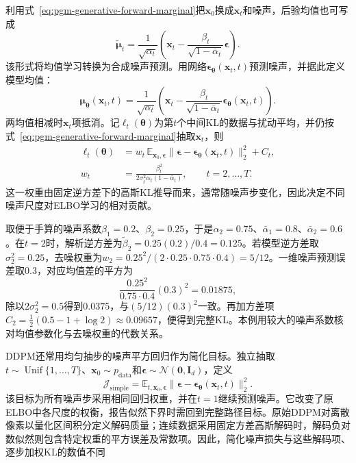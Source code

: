 利用式~\eqref{eq:pgm-generative-forward-marginal}把$\bm{x}_0$换成$\bm{x}_t$和噪声，后验均值也可写成
\[
  \widetilde{\bm{\mu}}_t
  =\frac{1}{\sqrt{\alpha_t}}
       \left(\bm{x}_t-
          \frac{\beta_t}{\sqrt{1-\bar{\alpha}_t}}\bm{\epsilon}\right).
\]
该形式将均值学习转换为合成噪声预测。用网络$\bm{\epsilon}_{\bm{\theta}}(\bm{x}_t,t)$预测噪声，并据此定义模型均值：
\begin{equation}
  \label{eq:pgm-generative-noise-parameterization}
  \bm{\mu}_{\bm{\theta}}(\bm{x}_t,t)
  =\frac{1}{\sqrt{\alpha_t}}
       \left(\bm{x}_t-
          \frac{\beta_t}{\sqrt{1-\bar{\alpha}_t}}
               \bm{\epsilon}_{\bm{\theta}}(\bm{x}_t,t)\right).
\end{equation}
两均值相减时$\bm{x}_t$项抵消。记$\ell_t(\bm{\theta})$为第$t$个中间KL的数据与扰动平均，并仍按式~\eqref{eq:pgm-generative-forward-marginal}抽取$\bm{x}_t$，则
\begin{equation}
  \label{eq:pgm-generative-weighted-denoising}
  \begin{aligned}
    \ell_t(\bm{\theta})
      &=w_t\,\mathbb{E}_{\bm{x}_0,\bm{\epsilon}}
         \lVert\bm{\epsilon}
          -\bm{\epsilon}_{\bm{\theta}}(\bm{x}_t,t)\rVert_2^2+C_t,\\
    w_t&=\frac{\beta_t^2}
              {2\sigma_t^2\alpha_t(1-\bar{\alpha}_t)},
          \qquad t=2,\ldots,T.
  \end{aligned}
\end{equation}
这一权重由固定逆方差下的高斯KL推导而来，通常随噪声步变化，因此决定不同噪声尺度对ELBO学习的相对贡献。

\begin{example}[核对一个扩散步的权重]
  \label{ex:pgm-generative-step-weight}
  取便于手算的噪声系数$\beta_1=0.2$、$\beta_2=0.25$，于是$\alpha_2=0.75$、$\bar{\alpha}_1=0.8$、$\bar{\alpha}_2=0.6$。在$t=2$时，解析逆方差为$\widetilde{\beta}_2=0.25(0.2)/0.4=0.125$。若模型逆方差取$\sigma_2^2=0.25$，去噪权重为$w_2=0.25^2/(2\cdot0.25\cdot0.75\cdot0.4)=5/12$。一维噪声预测误差取$0.3$，对应均值差的平方为
  \[
    \frac{0.25^2}{0.75\cdot0.4}(0.3)^2=0.01875,
  \]
  除以$2\sigma_2^2=0.5$得到$0.0375$，与$(5/12)(0.3)^2$一致。再加方差项$C_2=\tfrac12(0.5-1+\log2)\approx0.09657$，便得到完整KL。本例用较大的噪声系数核对均值参数化与去噪权重的代数关系。
\end{example}

DDPM还常用均匀抽步的噪声平方回归作为简化目标。独立抽取$t\sim\operatorname{Unif}\{1,\ldots,T\}$、$\bm{x}_0\sim p_{\mathrm{data}}$和$\bm{\epsilon}\sim\mathcal{N}(\bm{0},\bm{I}_d)$，定义
\begin{equation}
  \label{eq:pgm-generative-simple-loss}
  \mathcal{J}_{\mathrm{simple}}
  =\mathbb{E}_{t,\bm{x}_0,\bm{\epsilon}}
      \lVert\bm{\epsilon}
       -\bm{\epsilon}_{\bm{\theta}}(\bm{x}_t,t)\rVert_2^2.
\end{equation}
该目标为所有噪声步采用相同回归权重，并在$t=1$继续预测噪声。它改变了原ELBO中各尺度的权衡，报告似然下界时需回到完整路径目标。原始DDPM对离散像素以量化区间积分定义解码质量；连续数据采用固定方差高斯解码时，解码负对数似然则包含特定权重的平方误差及常数项。因此，简化噪声损失与这些解码项、逐步加权KL的数值不同

